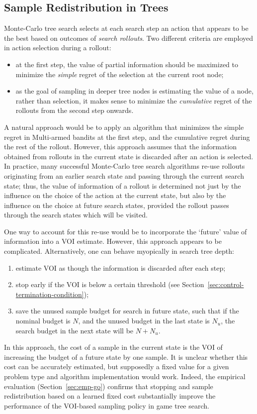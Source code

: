 \documentclass{article}
\begin{document}
\subsection{Sample Redistribution in Trees}
\label{sec:control-redistribution}

Monte-Carlo tree search \cite{Chaslot.montecarlo} selects at each
search step an action that appears to be the best based on outcomes
of \textit{search rollouts}. Two different criteria are employed in
action selection during a rollout:
\begin{itemize}
\item at the first step, the value of partial
information should be maximized to minimize the \textit{simple} regret
of the selection at the current root node;
\item as the goal of sampling in deeper tree nodes is estimating the
value of a node, rather than selection, it makes sense to minimize
the \textit{cumulative} regret of the rollouts from the second step
onwards.
\end{itemize}

A natural approach would be to apply an algorithm that minimizes the
simple regret in Multi-armed bandits at the first step, and the
cumulative regret during the rest of the rollout.  However, this
approach assumes that the information obtained from rollouts in the
current state is discarded after an action is selected. In practice,
many successful Monte-Carlo tree search algorithms re-use rollouts
originating from an earlier search state and passing through the
current search state; thus, the value of information of a rollout is
determined not just by the influence on the choice of the action at
the current state, but also by the influence on the choice at future
search states, provided the rollout passes through the search states
which will be visited.

One way to account for this re-use would be to incorporate the
`future' value of information into a VOI estimate. However, this 
approach appears to be complicated. Alternatively, one can behave
myopically in search tree depth:
\begin{enumerate}
\item estimate VOI as though the information is discarded after each step;
\item stop early if the VOI is below a certain threshold
   (see Section~\ref{sec:control-termination-condition});
\item save the unused sample budget for search in future state, such that
   if the nominal budget is $N$, and the unused budget in the last state
   is $N_u$, the search budget in the next state will be $N+N_u$.
\end{enumerate}
In this approach, the cost of a sample in the current state is the
VOI of increasing the budget of a future state by one sample.  It is
unclear whether this cost can be accurately estimated, but supposedly
a fixed value for a given problem type and algorithm implementation
would work. Indeed, the empirical evaluation (Section~\ref{sec:emp-go})
confirms that stopping and sample redistribution based on a learned
fixed cost  substantially improve the performance of the VOI-based
sampling policy in game tree search.
\end{document}
